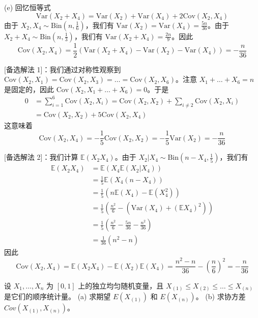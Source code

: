 \begin{questions}
\begin{solution}
(e) 回忆恒等式
\[
\text{Var}(X_2 + X_4) = \text{Var}(X_2) + \text{Var}(X_4) + 2 \text{Cov}(X_2, X_4)
\]
由于 $X_2, X_4 \sim \text{Bin}(n, \frac{1}{6})$，我们有 $\text{Var}(X_2) = \text{Var}(X_4) = \frac{5n}{36}$。由于 $X_2 + X_4 \sim \text{Bin}(n, \frac{1}{3})$，我们有 $\text{Var}(X_2 + X_4) = \frac{2n}{9}$。因此
\[
\text{Cov}(X_2, X_4) = \frac{1}{2} \left( \text{Var}(X_2 + X_4) - \text{Var}(X_2) - \text{Var}(X_4) \right) = -\frac{n}{36}
\]

[备选解法 1]：我们通过对称性观察到 $\text{Cov}(X_2, X_1) = \text{Cov}(X_2, X_3) = \dots = \text{Cov}(X_2, X_6)$。注意 $X_1 + \dots + X_6 = n$ 是固定的，因此 $\text{Cov}(X_2, X_1 + \dots + X_6) = 0$。于是
\begin{align*}
0 &= \sum_{i=1}^{6} \text{Cov}(X_2, X_i) = \text{Cov}(X_2, X_2) + \sum_{i \neq 2} \text{Cov}(X_2, X_i) \\
&= \text{Cov}(X_2, X_2) + 5 \text{Cov}(X_2, X_4)
\end{align*}
这意味着
\[
\text{Cov}(X_2, X_4) = -\frac{1}{5} \text{Cov}(X_2, X_2) = -\frac{1}{5} \text{Var}(X_2) = -\frac{n}{36}
\]

[备选解法 2]：我们计算 $\mathbb{E}(X_2 X_4)$。由于 $X_2 | X_4 \sim \text{Bin}(n - X_4, \frac{1}{5})$，我们有
\begin{align*}
\mathbb{E}(X_2 X_4) &= \mathbb{E}(X_4 \mathbb{E}(X_2 | X_4)) \\
&= \frac{1}{5} \mathbb{E}(X_4 (n - X_4)) \\
&= \frac{1}{5} \left( n \mathbb{E}(X_4) - \mathbb{E}(X_4^2) \right) \\
&= \frac{1}{5} \left( \frac{n^2}{6} - \left( \text{Var}(X_4) + (\mathbb{E}X_4)^2 \right) \right) \\
&= \frac{1}{5} \left( \frac{n^2}{6} - \frac{5n}{36} - \frac{n^2}{36} \right) \\
&= \frac{1}{36} (n^2 - n)
\end{align*}
因此
\[
\text{Cov}(X_2, X_4) = \mathbb{E}(X_2 X_4) - \mathbb{E}(X_2) \mathbb{E}(X_4) = \frac{n^2 - n}{36} - \left( \frac{n}{6} \right)^2 = -\frac{n}{36}
\]
\end{solution}

\question
设 $X_1, \dots, X_n$ 为 $[0, 1]$ 上的独立均匀随机变量，且 $X_{(1)} \le X_{(2)} \le \dots \le X_{(n)}$ 是它们的顺序统计量。
(a) 求期望 $E(X_{(1)})$ 和 $E(X_{(n)})$。
(b) 求协方差 $Cov(X_{(1)}, X_{(n)})$。


\end{questions}
